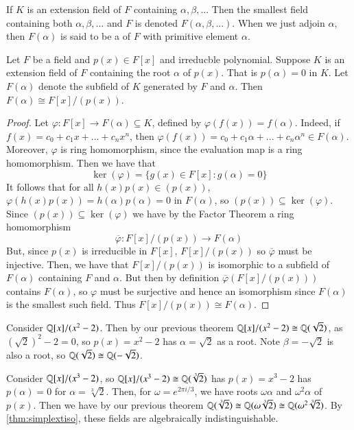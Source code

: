 \documentclass[12pt, a4paper, oneside, openright, titlepage]{book}
\begin{document}
\begin{defn}
    If $K$ is an extension field of $F$ containing $\alpha, \beta,...$ Then the smallest field containing both $\alpha,\beta,...$ and $F$ is denoted $F(\alpha,\beta,...)$. When we just adjoin $\alpha$, then $F(\alpha)$ is said to be a  of $F$ with primitive element $\alpha$.
\end{defn}


\begin{thm}\label{thm:simplextiso}
    Let $F$ be a field and $p(x) \in F[x]$ and irreducble polynomial. Suppose $K$ is an extension field of $F$ containing the root $\alpha$ of $p(x)$. That is $p(\alpha) = 0$ in $K$. Let $F(\alpha)$ denote the subfield of $K$ generated by $F$ and $\alpha$. Then $F(\alpha) \cong F[x]/(p(x))$.
\end{thm}
\begin{proof}
    Let $\varphi:F[x]\rightarrow F(\alpha) \subseteq K$, defined by $\varphi(f(x)) = f(\alpha)$. Indeed, if $f(x) = c_0+c_1x+...+c_nx^n$, then $\varphi(f(x)) = c_0+c_1\alpha+...+c_n\alpha^n \in F(\alpha)$. Moreover, $\varphi$ is ring homomorphism, since the evaluation map is a ring homomorphism. Then we have that $$\ker(\varphi) = \{g(x) \in F[x]:g(\alpha) = 0\}$$
    It follows that for all $h(x)p(x) \in (p(x))$, $\varphi(h(x)p(x)) = h(\alpha)p(\alpha) = 0$ in $F(\alpha)$, so $(p(x)) \subseteq \ker(\varphi)$. Since $(p(x)) \subseteq \ker(\varphi)$ we have by the Factor Theorem a ring homomorphism $$\overline{\varphi}:F[x]/(p(x)) \rightarrow F(\alpha)$$
    But, since $p(x)$ is irreducible in $F[x]$, $F[x]/(p(x))$ so $\overline{\varphi}$ must be injective. Then, we have that $F[x]/(p(x))$ is isomorphic to a subfield of $F(\alpha)$ containing $F$ and $\alpha$. But then by definition $\overline{\varphi}(F[x]/(p(x)))$ contains $F(\alpha)$, so $\varphi$ must be surjective and hence an isomorphism since $F(\alpha)$ is the smallest such field. Thus $F[x]/(p(x)) \cong F(\alpha)$.
\end{proof}


\begin{eg}
    Consider $\mathbb Q[x]/(x^2-2)$. Then by our previous theorem $\mathbb Q[x]/(x^2-2) \cong \mathbb Q(\sqrt{2})$, as $(\sqrt{2})^2 - 2 = 0$, so $p(x) = x^2-2$ has $\alpha = \sqrt{2}$ as a root. Note $\beta = -\sqrt{2}$ is also a root, so $\mathbb Q(\sqrt{2}) \cong \mathbb Q(-\sqrt{2})$.
\end{eg}

\begin{eg}
    Consider $\mathbb Q[x]/(x^3-2)$, so $\mathbb Q[x]/(x^3-2) \cong \mathbb Q(\sqrt[3]{2})$ has $p(x) = x^3-2$ has $p(\alpha) = 0$ for $\alpha = \sqrt[3]{2}$. Then, for $\omega = e^{2\pi i/3}$, we have roots $\omega\alpha$ and $\omega^2\alpha$ of $p(x)$. Then we have by our previous theorem $\mathbb Q(\sqrt[3]{2}) \cong \mathbb Q(\omega\sqrt[3]{2}) \cong \mathbb Q(\omega^2\sqrt[3]{2})$. By \ref{thm:simplextiso}, these fields are algebraically indistinguishable. 
\end{eg}
\end{document}
